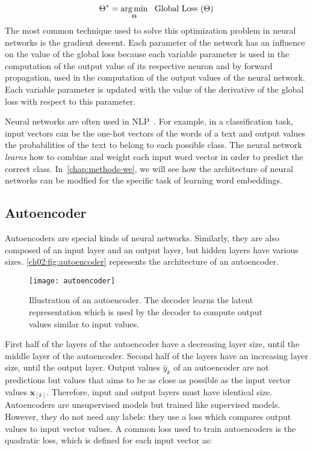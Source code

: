     \begin{equation}
      \Theta^* = \operatorname*{arg\,min}_{\Theta}~~\text{Global Loss  } (\Theta)
    \end{equation}
    The most common technique used to solve this optimization problem in neural
    networks is the gradient descent. Each parameter of the network has an
    influence on the value of the global loss because each variable parameter is
    used in the computation of the output value of its respective neuron and by
    forward propagation, used in the computation of the output values of the
    neural network. Each variable parameter is updated with the value of the
    derivative of the global loss with respect to this parameter. \medskip

    Neural networks are often used in NLP~\citep{zhang2015character,
    Xu2015convolutional, conneau2016very}. For example, in a classification
    task, input vectors can be the one-hot vectors of the words of a text and
    output values the probabilities of the text to belong to each possible
    class. The neural network \textit{learns} how to combine and weight each
    input word vector in order to predict the correct class.
    In~\autoref{chap:methods-we}, we will see how the architecture of neural
    networks can be modfied for the specific task of learning word embeddings.

  \subsection{Autoencoder}
    \label{ch02:subsec:autoencoder}
    Autoencoders are special kinds of neural networks. Similarly, they are also
    composed of an input layer and an output layer, but hidden layers have
    various sizes. \autoref{ch02:fig:autoencoder} represents the architecture of
    an autoencoder.

    \begin{figure}[t]
      \centering
      \texttt{[image: autoencoder]}
      \caption[Illustration of an autoencoder.] {Illustration of an autoencoder.
      The decoder learns the latent representation which is used by the decoder
      to compute output values similar to input values.}
      \label{ch02:fig:autoencoder}
    \end{figure}

    First half of the layers of the autoencoder have a decreasing layer size,
    until the middle layer of the autoencoder. Second half of the layers have an
    increasing layer size, until the output layer. Output values $\hat{y}_k$ of
    an autoencoder are not predictions but values that aims to be as close as
    possible as the input vector values $\mathbf{x}_{[k]}$. Therefore, input and
    output layers must have identical size. Autoencoders are unsupervised models
    but trained like supervised models. However, they do not need any labels:
    they use a loss which compares output values to input vector values. A
    common loss used to train autoencoders is the quadratic loss, which is
    defined for each input vector as:

